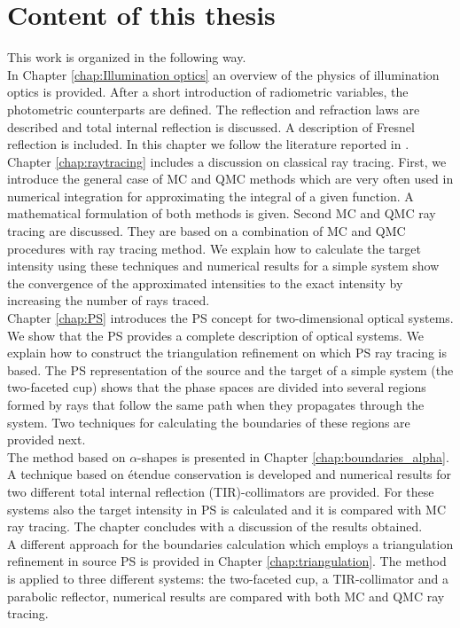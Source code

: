\section{Content of this thesis}
This work is organized in the following way.\\ \indent
In Chapter \ref{chap:Illumination optics} an overview of the physics of illumination optics is provided. After a short introduction of radiometric variables, the photometric counterparts are defined. The reflection and refraction laws are described and total internal reflection is discussed. A description of Fresnel reflection is included. In this chapter we follow the literature reported in \cite{hecht1998hecht, feynman2011feynman, feynman1964feynman}.\\ \indent
Chapter \ref{chap:raytracing} includes a discussion on classical ray tracing. First, we introduce the general case of MC and QMC methods which are very often used in numerical integration for approximating the integral of a given function. A mathematical formulation of both methods is given. Second MC and QMC ray tracing are discussed. They are based on a combination of MC and QMC procedures with ray tracing method. We explain how to calculate the target intensity using these techniques and numerical results for a simple system show the convergence of the approximated intensities to the exact intensity by increasing the number of rays traced.\\\indent
Chapter \ref{chap:PS} introduces the PS concept for two-dimensional optical systems. We show that the PS provides a complete description of optical systems. We explain how to construct the triangulation refinement on which PS ray tracing is based. The PS representation of the source and the target of a simple system (the two-faceted cup) shows that the phase spaces are divided into several regions formed by rays that follow the same path when they propagates through the system. Two techniques for calculating the boundaries of these regions are provided next. \\ \indent 
The method based on $\alpha$-shapes is presented in Chapter \ref{chap:boundaries_alpha}. A technique based on \'{e}tendue conservation is developed and numerical results for two different total internal reflection (TIR)-collimators are provided. For these systems also the target intensity in PS is calculated and it is compared with MC ray tracing. The chapter concludes with a discussion of the results obtained.\\ \indent
A different approach for the boundaries calculation which employs a triangulation refinement in source PS is provided in Chapter \ref{chap:triangulation}. The method is applied to three different systems: the two-faceted cup, a TIR-collimator and a parabolic reflector, numerical results are compared with both MC and QMC ray tracing.

